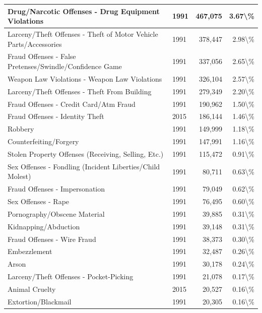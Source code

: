 \documentclass[
]{krantz}
\begin{document}
\begin{longtable}[t]{l|l|r|r}
\hline
Drug/Narcotic Offenses - Drug Equipment Violations & 1991 & 467,075 & 3.67\textbackslash{}\%\\
\hline
Larceny/Theft Offenses - Theft of Motor Vehicle Parts/Accessories & 1991 & 378,447 & 2.98\textbackslash{}\%\\
\hline
Fraud Offenses - False Pretenses/Swindle/Confidence Game & 1991 & 337,056 & 2.65\textbackslash{}\%\\
\hline
Weapon Law Violations - Weapon Law Violations & 1991 & 326,104 & 2.57\textbackslash{}\%\\
\hline
Larceny/Theft Offenses - Theft From Building & 1991 & 279,349 & 2.20\textbackslash{}\%\\
\hline
Fraud Offenses - Credit Card/Atm Fraud & 1991 & 190,962 & 1.50\textbackslash{}\%\\
\hline
Fraud Offenses - Identity Theft & 2015 & 186,144 & 1.46\textbackslash{}\%\\
\hline
Robbery & 1991 & 149,999 & 1.18\textbackslash{}\%\\
\hline
Counterfeiting/Forgery & 1991 & 147,991 & 1.16\textbackslash{}\%\\
\hline
Stolen Property Offenses (Receiving, Selling, Etc.) & 1991 & 115,472 & 0.91\textbackslash{}\%\\
\hline
Sex Offenses - Fondling (Incident Liberties/Child Molest) & 1991 & 80,711 & 0.63\textbackslash{}\%\\
\hline
Fraud Offenses - Impersonation & 1991 & 79,049 & 0.62\textbackslash{}\%\\
\hline
Sex Offenses - Rape & 1991 & 76,495 & 0.60\textbackslash{}\%\\
\hline
Pornography/Obscene Material & 1991 & 39,885 & 0.31\textbackslash{}\%\\
\hline
Kidnapping/Abduction & 1991 & 39,148 & 0.31\textbackslash{}\%\\
\hline
Fraud Offenses - Wire Fraud & 1991 & 38,373 & 0.30\textbackslash{}\%\\
\hline
Embezzlement & 1991 & 32,487 & 0.26\textbackslash{}\%\\
\hline
Arson & 1991 & 30,178 & 0.24\textbackslash{}\%\\
\hline
Larceny/Theft Offenses - Pocket-Picking & 1991 & 21,078 & 0.17\textbackslash{}\%\\
\hline
Animal Cruelty & 2015 & 20,527 & 0.16\textbackslash{}\%\\
\hline
Extortion/Blackmail & 1991 & 20,305 & 0.16\textbackslash{}\%\\

\end{longtable}
\end{document}
